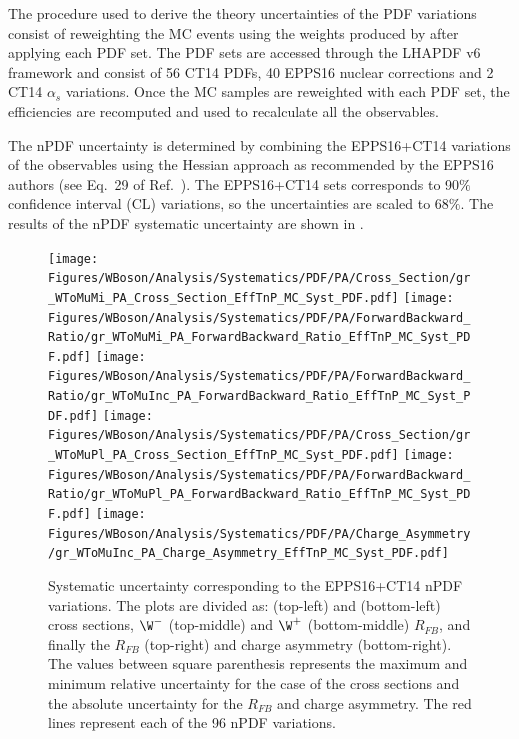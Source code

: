 The procedure used to derive the theory uncertainties of the PDF variations consist of reweighting the MC events using the weights produced by \POWHEG after applying each PDF set. The PDF sets are accessed through the LHAPDF v6 \cite{LHAPDF6} framework and consist of 56 CT14 PDFs, 40 EPPS16 nuclear corrections and 2 CT14 $\alpha_{s}$ variations. Once the MC samples are reweighted with each PDF set, the efficiencies are recomputed and used to recalculate all the observables.

The nPDF uncertainty is determined by combining the EPPS16+CT14 variations of the observables using the Hessian approach as recommended by the EPPS16 authors (see Eq.~29 of Ref.~\cite{EPS09}). The EPPS16+CT14 sets corresponds to 90$\%$ confidence interval (CL) variations, so the uncertainties are scaled to 68$\%$. The results of the nPDF systematic uncertainty are shown in .

\begin{figure}[!htbp]
 \begin{center}
  \texttt{[image: Figures/WBoson/Analysis/Systematics/PDF/PA/Cross\_Section/gr\_WToMuMi\_PA\_Cross\_Section\_EffTnP\_MC\_Syst\_PDF.pdf]}
  \texttt{[image: Figures/WBoson/Analysis/Systematics/PDF/PA/ForwardBackward\_Ratio/gr\_WToMuMi\_PA\_ForwardBackward\_Ratio\_EffTnP\_MC\_Syst\_PDF.pdf]}
  \texttt{[image: Figures/WBoson/Analysis/Systematics/PDF/PA/ForwardBackward\_Ratio/gr\_WToMuInc\_PA\_ForwardBackward\_Ratio\_EffTnP\_MC\_Syst\_PDF.pdf]}
  \texttt{[image: Figures/WBoson/Analysis/Systematics/PDF/PA/Cross\_Section/gr\_WToMuPl\_PA\_Cross\_Section\_EffTnP\_MC\_Syst\_PDF.pdf]}
  \texttt{[image: Figures/WBoson/Analysis/Systematics/PDF/PA/ForwardBackward\_Ratio/gr\_WToMuPl\_PA\_ForwardBackward\_Ratio\_EffTnP\_MC\_Syst\_PDF.pdf]}
  \texttt{[image: Figures/WBoson/Analysis/Systematics/PDF/PA/Charge\_Asymmetry/gr\_WToMuInc\_PA\_Charge\_Asymmetry\_EffTnP\_MC\_Syst\_PDF.pdf]}
 \end{center}
 \caption{Systematic uncertainty corresponding to the EPPS16+CT14 nPDF variations. The plots are divided as: \WToMuNuMi (top-left) and \WToMuNuPl (bottom-left) cross sections, $\W^{-}$ (top-middle) and $\W^{+}$ (bottom-middle) $R_{FB}$, and finally the \W $R_{FB}$ (top-right) and \W charge asymmetry (bottom-right). The values between square parenthesis represents the maximum and minimum relative uncertainty for the case of the cross sections and the absolute uncertainty for the $R_{FB}$ and charge asymmetry. The red lines represent each of the 96 nPDF variations. }
 \label{fig:Systematic_MC_Syst_PDF}
\end{figure}


